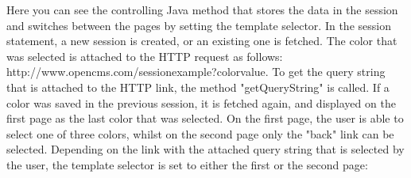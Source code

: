 Here you can see the controlling Java method that stores the data in the
session and switches between the pages by setting the template selector.
In the session statement, a new session is created, or an existing one is
fetched. The color that was selected is attached to the HTTP request as
follows: http://www.opencms.com/sessionexample?colorvalue. To get the
query string that is attached to the HTTP link, the method
{\meth "getQueryString"} is called. If a color was saved in the previous session,
it is fetched again, and displayed on the first page as the last color
that was selected. On the first page, the user is able to select one of
three colors, whilst on the second page only the "back" link can be
selected. Depending on the link with the attached query string that is
selected by the user, the template selector is set to either the first
or the second page:

